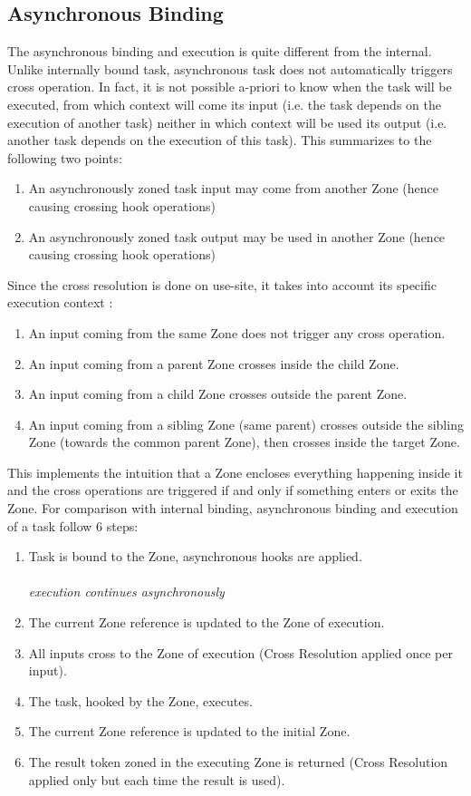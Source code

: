 \subsection*{Asynchronous Binding}

The asynchronous binding and execution is quite different from the internal. Unlike internally bound task, asynchronous task does not automatically triggers cross operation. In fact, it is not possible a-priori to know when the task will be executed, from which context will come its input (i.e. the task depends on the execution of another task) neither in which context will be used its output (i.e. another task depends on the execution of this task). This summarizes to the following two points:
\begin{enumerate}
\item An asynchronously zoned task input may come from another Zone (hence causing crossing hook operations)
\item An asynchronously zoned task output may be used in another Zone (hence causing crossing hook operations)
\end{enumerate}

Since the cross resolution is done on use-site, it takes into account its specific execution context :
\begin{enumerate}
\item An input coming from the same Zone does not trigger any cross operation.
\item An input coming from a parent Zone crosses inside the child Zone.
\item An input coming from a child Zone crosses outside the parent Zone.
\item An input coming from a sibling Zone (same parent) crosses outside the sibling Zone (towards the common parent Zone), then crosses inside the target Zone.
\end{enumerate}

This implements the intuition that a Zone encloses everything happening inside it and the cross operations are triggered if and only if something enters or exits the Zone.
For comparison with internal binding, asynchronous binding and execution of a task follow 6 steps:

\begin{enumerate}
\item Task is bound to the Zone, asynchronous hooks are applied. \\ \\
\textit{execution continues asynchronously} \\
\item The current Zone reference is updated to the Zone of execution.
\item All inputs cross to the Zone of execution (Cross Resolution applied once per input).
\item The task, hooked by the Zone, executes.
\item The current Zone reference is updated to the initial Zone.
\item The result token zoned in the executing Zone is returned (Cross Resolution applied only but each time the result is used).

\end{enumerate}

